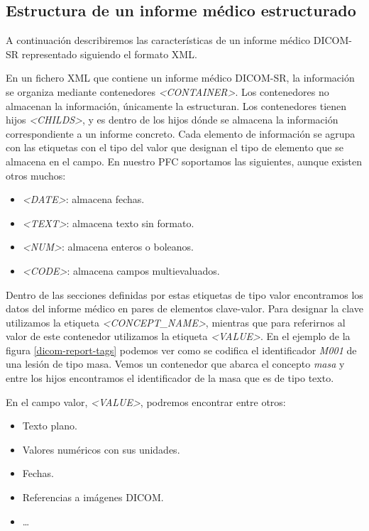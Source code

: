 \subsection{Estructura de un informe médico estructurado} \label{dicomsr:ficheros}
A continuación describiremos las características de un informe médico DICOM-SR representado siguiendo el formato XML.\par
En un fichero XML que contiene un informe médico DICOM-SR, la información se organiza mediante contenedores \textit{<CONTAINER>}. Los contenedores no almacenan la información, únicamente la estructuran. Los contenedores tienen hijos \textit{<CHILDS>}, y es dentro de los hijos dónde se almacena la información correspondiente a un informe concreto. Cada elemento de información se agrupa con las etiquetas con el tipo del valor que designan el tipo de elemento que se almacena en el campo. En nuestro PFC soportamos las siguientes, aunque existen otros muchos:
\begin{itemize} 
 	\item \textit{<DATE>}: almacena fechas.
 	\item \textit{<TEXT>}: almacena texto sin formato.
 	\item \textit{<NUM>}: almacena enteros o boleanos.
 	\item \textit{<CODE>}: almacena campos multievaluados.
 \end{itemize}
Dentro de las secciones definidas por estas etiquetas de tipo valor encontramos los datos del informe médico en pares de elementos clave-valor. Para designar la clave utilizamos la etiqueta \textit{<CONCEPT\_NAME>}, mientras que para referirnos al valor de este contenedor utilizamos la etiqueta \textit{<VALUE>}.
En el ejemplo de la figura \ref{dicom-report-tags} podemos ver como se codifica el identificador \textit{M001} de una lesión de tipo masa. Vemos un contenedor que abarca el concepto \textit{masa} y entre los hijos encontramos el identificador de la masa que es de tipo texto.\par
En el campo valor, \textit{<VALUE>}, podremos encontrar entre otros:
\begin{itemize}
	\item Texto plano.
	\item Valores numéricos con sus unidades.
	\item Fechas.
	\item Referencias a imágenes DICOM.
	\item \ldots
\end{itemize}\par

